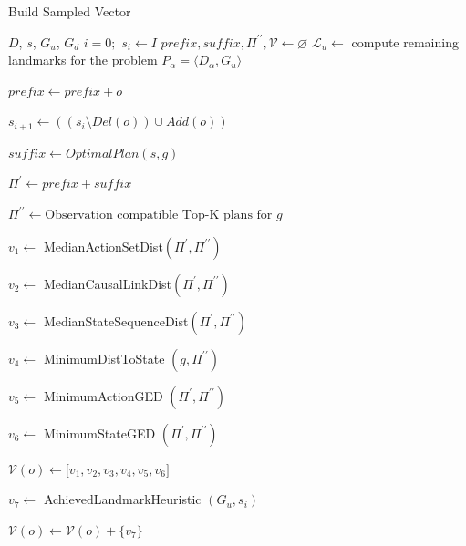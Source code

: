 \documentclass[letterpaper]{article}
\theoremstyle{plain}
\begin{document}
\setlength{\textfloatsep}{2pt}
\begin{algorithm}[tb]
\tiny
        \caption{Build Sampled Vector}
        \label{alg:apx}
        \begin{algorithmic}[1]
                \Require $D$, $s$, $G_u$, $G_d$
                \State $i=0;$ $ s_{i} \gets I $
                \State $prefix,suffix,\Pi^{\prime\prime}, \mathcal{V} \gets \varnothing$
                        \State $\mathcal{L}_{u} \gets$ compute remaining landmarks for the problem $P_\alpha=\langle D_\alpha, G_u\rangle$
                        \State \parbox[t]{0.95\linewidth}{$prefix \gets prefix + o$}
                        \State \parbox[t]{0.95\linewidth} 
                                {$s_{i+1} \gets ((s_{i} \setminus Del(o))\cup Add(o))$}
                                \State \parbox[t]{0.95\linewidth}{$suffix \gets OptimalPlan(s,g)$}
                                \State \parbox[t]{0.95\linewidth}{$\Pi^\prime \gets prefix + suffix$}
                                \State \parbox[t]{0.95\linewidth}{$\Pi^{\prime\prime} \gets \text{Observation compatible Top-K plans for } g$}
                                \State \parbox[t]{0.95\linewidth}{$v_1 \gets$ MedianActionSetDist$(\Pi^\prime, \Pi^{\prime\prime})$}
                                \State \parbox[t]{0.95\linewidth}{$v_2 \gets$ MedianCausalLinkDist$(\Pi^\prime, \Pi^{\prime\prime})$}
                                \State \parbox[t]{0.95\linewidth}{$v_3 \gets$ MedianStateSequenceDist$(\Pi^\prime,\Pi^{\prime\prime})$}
                                \State \parbox[t]{0.95\linewidth}{$v_4 \gets$ MinimumDistToState $(g,\Pi^{\prime\prime})$}
                                \State \parbox[t]{0.95\linewidth}{$v_5 \gets$ MinimumActionGED $(\Pi^\prime, \Pi^{\prime\prime})$}
                                \State \parbox[t]{0.95\linewidth}{$v_6 \gets$ MinimumStateGED $(\Pi^\prime, \Pi^{\prime\prime})$}
                                \State $\mathcal{V}(o) \gets \lbrack v_1,v_2,v_3,v_4,v_5,v_6\rbrack $
                        \EndFor
                        \State \parbox[t]{0.95\linewidth}{$v_7 \gets$ AchievedLandmarkHeuristic $(G_u,s_{i})$}
                        \State $\mathcal{V}(o) \gets \mathcal{V}(o)+\{v_7\}$
                \EndFor
                \EndProcedure
        \end{algorithmic}
\end{algorithm}

\end{document}

